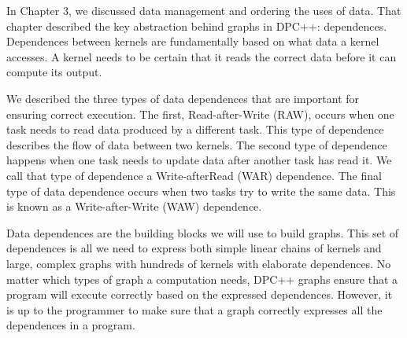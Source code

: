 In Chapter 3, we discussed data management and ordering the uses of data. That chapter described the key abstraction behind graphs in DPC++: dependences. Dependences between kernels are fundamentally based on what data a kernel accesses. A kernel needs to be certain that it reads the correct data before it can compute its output.\par

We described the three types of data dependences that are important for ensuring correct execution. The first, Read-after-Write (RAW), occurs when one task needs to read data produced by a different task. This type of dependence describes the flow of data between two kernels. The second type of dependence happens when one task needs to update data after another task has read it. We call that type of dependence a Write-afterRead (WAR) dependence. The final type of data dependence occurs when two tasks try to write the same data. This is known as a Write-after-Write (WAW) dependence.\par

Data dependences are the building blocks we will use to build graphs. This set of dependences is all we need to express both simple linear chains of kernels and large, complex graphs with hundreds of kernels with elaborate dependences. No matter which types of graph a computation needs, DPC++ graphs ensure that a program will execute correctly based on the expressed dependences. However, it is up to the programmer to make sure that a graph correctly expresses all the dependences in a program.\par